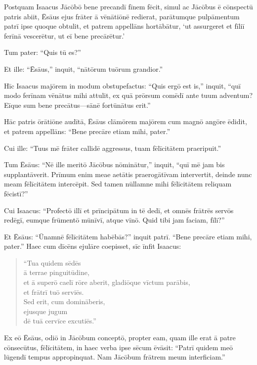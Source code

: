 \Versus Postquam Isaacus Jācōbō bene precandī fīnem fēcit, simul ac Jācōbus ē cōnspectū patris abiit, Ēsāus ejus frāter ā vēnātiōnē redierat,
\Versus parātumque pulpāmentum patrī ipse quoque obtulit, et patrem appellāns hortābātur, `ut assurgeret et fīliī ferīnā vescerētur, ut eī bene precārētur.'

\Versus Tum pater: ``Quis tū es?''

Et ille: ``Ēsāus,'' inquit, ``nātōrum tuōrum grandior.''

\Versus Hīc Isaacus majōrem in modum obstupefactus: ``Quis ergō est is,'' inquit, ``quī modo ferīnam vēnātus mihi attulit, ex quā prōrsum comēdī ante tuum adventum? Eīque sum bene precātus—sānē fortūnātus erit.''

\Versus Hāc patris ōrātiōne audītā, Ēsāus clāmōrem majōrem cum magnō angōre ēdidit, et patrem appellāns: ``Bene precāre etiam mihi, pater.''

\Versus Cui ille: ``Tuus mē frāter callidē aggressus, tuam fēlīcitātem praeripuit.''

\Versus Tum Ēsāus: ``Nē ille meritō Jācōbus nōminātur,'' inquit, ``quī mē jam bis supplantāverit. Prīmum enim meae aetātis praerogātīvam intervertit, deinde nunc meam fēlīcitātem intercēpit. Sed tamen nūllamne mihi fēlīcitātem reliquam fēcistī?''

\Versus Cui Isaacus: ``Profectō illī et prīncipātum in tē dedī, et omnēs frātrēs servōs redēgī, eumque frūmentō mūnīvī, atque vīnō. Quid tibi jam faciam, fīlī?''

\Versus Et Ēsāus: ``Ūnamnē fēlīcitātem habēbās?'' inquit patrī. ``Bene precāre etiam mihi, pater.''
Haec cum dīcēns ejulāre coepisset,
\Versus sīc īnfit Isaacus:

\begin{verse}
\begin{patverse*}
``Tua quidem sēdēs\\
 ā terrae pinguitūdine,\\
 et ā superō caelī rōre aberit,
\Versus gladiōque vīctum parābis,\\
 et frātrī tuō serviēs.\\
 Sed erit, cum domināberis,\\
 ejusque jugum \\
 dē tuā cervīce excutiēs.''
\end{patverse*}
\end{verse}

\Versus Ex eō Ēsāus, odiō in Jācōbum conceptō, propter eam, quam ille erat ā patre cōnsecūtus, fēlīcitātem, in haec verba ipse sēcum ēvāsit: ``Patrī quidem meō lūgendī tempus appropinquat. Nam Jācōbum frātrem meum interficiam.''

